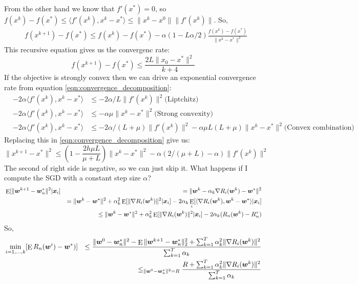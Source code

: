 \documentclass[11pt, a4paper, reqno, twoside]{scrartcl}
\theoremstyle{style}
\DeclareMathOperator*{\E}{\rm E}
\newcommand{\x}{\bm{x}}
\newcommand{\wv}{\bm{w}}
\newcommand{\0}{\mathbf{0}} %
\begin{document}
From the other hand we know that $f'(x^*) = 0$, so $f(x^k) - f(x^*) \leq \langle
f'(x^k), x^k - x^* \rangle \leq \|x^k - x^0 \| \|f'(x^k) \|$. So, 
\begin{eqnarray*}
	& f(x^{k+1})  - f(x^*) \leq f(x^k) - f(x^*) - \alpha(1 - L \alpha/2) \frac{f(x^k)
	- f(x^*)}{\|x^k - x^* \|^2}
\end{eqnarray*}
This recursive equation gives us the convergenc rate: 
\begin{equation*}
	f(x^{k+1})  - f(x^*)  \leq \frac{2L\|x_0-x^*\|^2}{k+4}
\end{equation*}
If the objective is strongly convex then we can drive an exponential convergence
rate from equation \ref{eqn:convergence_decomposition}: 
\begin{eqnarray*}
	& - 2 \alpha \langle f'(x^k), x^k - x^* \rangle & \leq -2 \alpha/L \|f'(x^k)
	\|^2 \text{(Liptchitz)}\\ 
	& - 2 \alpha \langle f'(x^k), x^k - x^* \rangle & \leq -\alpha \mu \| x^k - x^*
	\|^2 \text{(Strong convexity)} \\ 
	& - 2 \alpha \langle f'(x^k), x^k - x^* \rangle & 
	\leq -2\alpha /(L+\mu)\|f'(x^k)
	\|^2 -\alpha \mu L(L+\mu) \|x^k - x^*\|^2 \text{(Convex combination)}
\end{eqnarray*}
Replacing this in \ref{eqn:convergence_decomposition} give us: 
\begin{equation*}
	 \| x^{k+1} - x^* \|^2  \leq 
	 (1-\frac{2 h \mu L}{\mu + L})\| x^{k} - x^* \|^2
	- \alpha( 2/(\mu + L) - \alpha) \| f'(x^k) \|^2
\end{equation*}
The second of right side is negative, so we can just skip it. 
What happens if I
compute the SGD with a constant step size $\alpha$?
\begin{eqnarray*}
	& \E[ \| \wv^{k+1} - \wv^*_n \|^2 | \x_i] & = \|
	\wv^{k} - \alpha_k \nabla R_i(\wv^k) - \wv^* \|^2 \\ 
	&  & = \| \wv^k - \wv^* \|^2 + \alpha_k^2 \E[\|\nabla R_i(\wv^k) \|^2|\x_i]  -
	2 \alpha_k \E_i [\langle \nabla R_i(\wv^k),\wv^k - \wv^* \rangle|\x_i] \\ 
	& & \leq \| \wv^k - \wv^* \|^2 + \alpha_k^2 \E[\|\nabla R_i(\wv^k) \|^2|\x_i] -
	2 \alpha_k (R_n(\wv^{k})- R^*_n)
\end{eqnarray*}
So, 
\begin{eqnarray*}
  & \min_{i=1,\ldots,k} [\E R_n(\wv^i)-\wv^*)] & \leq \frac{ \| \wv^0 - \wv^*_n
  \|^2 - \E \| \wv^{k+1} - \wv^*_n \|^2_2 + \sum_{k=1}^T \alpha_k^2 \| \nabla
  R_i(\wv^k) \|^2}{\sum_{k=1}^T \alpha_k} \\ 
  & & \leq_{\| \wv^0 - \wv^*_n
  \|^2 = R} \frac{R + \sum_{k=1}^T \alpha_k^2 \| \nabla
  R_i(\wv^k) \|^2}{\sum_{k=1}^T \alpha_k}
\end{eqnarray*}
\end{document}
